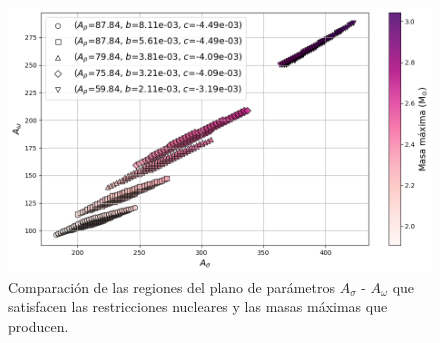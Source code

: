 \begin{figure}[h]
    \centering
    \includegraphics[width=0.7\linewidth]{Figuras/comparacion_regiones}
    \caption[Comparación de regiones en el plano $A_\sigma$ - $A_\omega$]{Comparación de las regiones del plano de parámetros $A_\sigma$ - $A_\omega$ que satisfacen las restricciones nucleares y las masas máximas que producen.}
    \label{fig:comparacion_regiones}
\end{figure}
